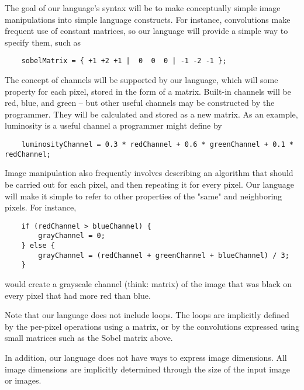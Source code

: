 The goal of our language's syntax will be to make conceptually simple image
manipulations into simple language constructs. For instance, convolutions make
frequent use of constant matrices, so our language will provide a simple way
to specify them, such as
\begin{verbatim}
    sobelMatrix = { +1 +2 +1 |  0  0  0 | -1 -2 -1 };
\end{verbatim}
The concept of channels will be supported by our language, which will some
property for each pixel, stored in the form of a matrix. Built-in channels will
be red, blue, and green -- but other useful channels may be constructed by
the programmer. They will be calculated and stored as a new matrix. As an
example, luminosity is a useful channel a programmer might define by
\begin{verbatim}
    luminosityChannel = 0.3 * redChannel + 0.6 * greenChannel + 0.1 * redChannel;
\end{verbatim}
Image manipulation also frequently involves describing an algorithm that should
be carried out for each pixel, and then repeating it for every pixel. Our
language will make it simple to refer to other properties of the "same" and
neighboring pixels. For instance,
\begin{verbatim}
    if (redChannel > blueChannel) {
        grayChannel = 0;
    } else {
        grayChannel = (redChannel + greenChannel + blueChannel) / 3;
    }
\end{verbatim}
would create a grayscale channel (think: matrix) of the image that was black on
every pixel that had more red than blue.

Note that our language does not include loops. The loops are implicitly defined
by the per-pixel operations using a matrix, or by the convolutions expressed
using small matrices such as the Sobel matrix above.

In addition, our language does not have ways to express image dimensions. All
image dimensions are implicitly determined through the size of the input image
or images.
